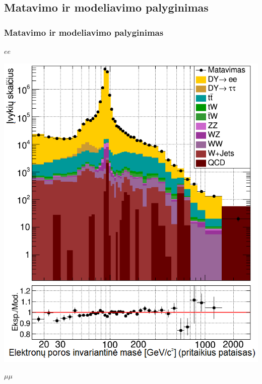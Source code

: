 \documentclass[xcolor=dvipsnames]{beamer}
\newcommand{\ee}{\mathit{ee}}
\newcommand{\mumu}{\mu\mu}
\begin{document}
\begin{frame}
	\section{Matavimo ir modeliavimo palyginimas}
	\frametitle{Matavimo ir modeliavimo palyginimas}
	\begin{minipage}{0.49\textwidth}
		\centering
		$\ee$
		
		\includegraphics[width=\linewidth]{eeMassAfter_SMALL.png}
	\end{minipage}
	\hfill
	\begin{minipage}{0.49\textwidth}
		\centering
		$\mumu$
		

\end{minipage}
\end{frame}
\end{document}
